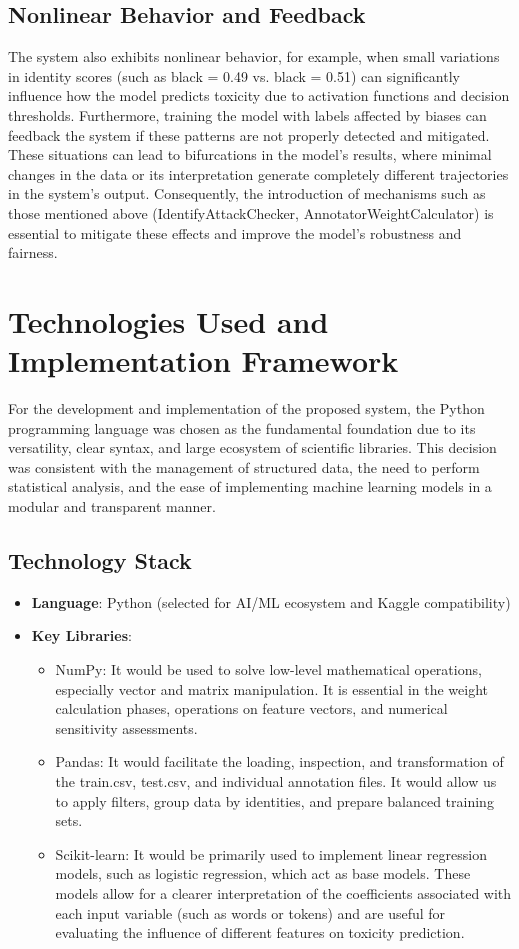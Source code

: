 \documentclass[conference]{IEEEtran}
\begin{document}
\subsection{Nonlinear Behavior and Feedback}
The system also exhibits nonlinear behavior, for example, when small variations in identity scores (such as black = 0.49 vs. black = 0.51) can significantly influence how the model predicts toxicity due to activation functions and decision thresholds. Furthermore, training the model with labels affected by biases can feedback the system if these patterns are not properly detected and mitigated.
These situations can lead to bifurcations in the model's results, where minimal changes in the data or its interpretation generate completely different trajectories in the system's output. Consequently, the introduction of mechanisms such as those mentioned above (IdentifyAttackChecker, AnnotatorWeightCalculator) is essential to mitigate these effects and improve the model's robustness and fairness.

\section{Technologies Used and Implementation Framework}
For the development and implementation of the proposed system, the Python programming language was chosen as the fundamental foundation due to its versatility, clear syntax, and large ecosystem of scientific libraries. This decision was consistent with the management of structured data, the need to perform statistical analysis, and the ease of implementing machine learning models in a modular and transparent manner.
\subsection{Technology Stack}
\begin{itemize}
\item \textbf{Language}: Python (selected for AI/ML ecosystem and Kaggle compatibility)
\item \textbf{Key Libraries}:
\begin{itemize}
\item NumPy: It would be used to solve low-level mathematical operations, especially vector and matrix manipulation. It is essential in the weight calculation phases, operations on feature vectors, and numerical sensitivity assessments.
\item Pandas: It would facilitate the loading, inspection, and transformation of the train.csv, test.csv, and individual annotation files. It would allow us to apply filters, group data by identities, and prepare balanced training sets.
\item Scikit-learn: It would be primarily used to implement linear regression models, such as logistic regression, which act as base models. These models allow for a clearer interpretation of the coefficients associated with each input variable (such as words or tokens) and are useful for evaluating the influence of different features on toxicity prediction.
\end{itemize}
\end{itemize}
\end{document}
